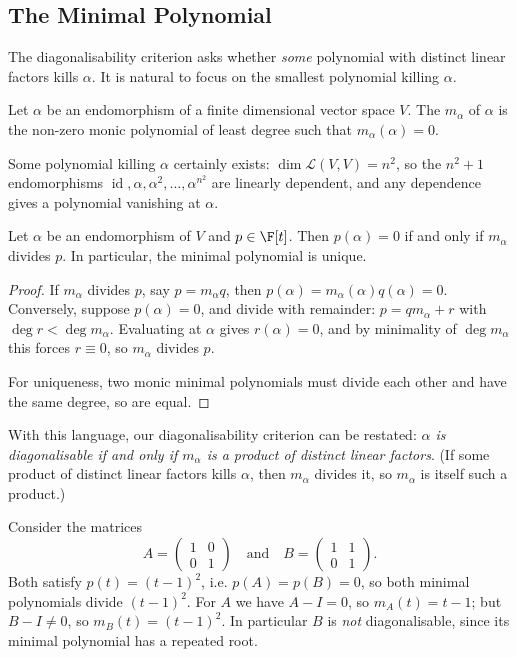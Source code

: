 \subsection{The Minimal Polynomial}

The diagonalisability criterion asks whether \emph{some} polynomial with distinct linear factors kills $\alpha$. It is natural to focus on the smallest polynomial killing $\alpha$.

\begin{definition}
    Let $\alpha$ be an endomorphism of a finite dimensional vector space $V$. The  $m_\alpha$ of $\alpha$ is the non-zero monic polynomial of least degree such that $m_\alpha(\alpha) = 0$.
\end{definition}

Some polynomial killing $\alpha$ certainly exists: $\dim \mathcal{L}(V, V) = n^2$, so the $n^2 + 1$ endomorphisms $\operatorname{id}, \alpha, \alpha^2, \dots, \alpha^{n^2}$ are linearly dependent, and any dependence gives a polynomial vanishing at $\alpha$.

\begin{lemma}
    Let $\alpha$ be an endomorphism of $V$ and $p \in \F[t]$. Then $p(\alpha) = 0$ if and only if $m_\alpha$ divides $p$. In particular, the minimal polynomial is unique.
\end{lemma}
\begin{proof}
    If $m_\alpha$ divides $p$, say $p = m_\alpha q$, then $p(\alpha) = m_\alpha(\alpha)q(\alpha) = 0$. Conversely, suppose $p(\alpha) = 0$, and divide with remainder: $p = q m_\alpha + r$ with $\deg r < \deg m_\alpha$. Evaluating at $\alpha$ gives $r(\alpha) = 0$, and by minimality of $\deg m_\alpha$ this forces $r \equiv 0$, so $m_\alpha$ divides $p$.

    For uniqueness, two monic minimal polynomials must divide each other and have the same degree, so are equal.
\end{proof}

With this language, our diagonalisability criterion can be restated: \emph{$\alpha$ is diagonalisable if and only if $m_\alpha$ is a product of distinct linear factors}. (If some product of distinct linear factors kills $\alpha$, then $m_\alpha$ divides it, so $m_\alpha$ is itself such a product.)

\begin{example}
    Consider the matrices
    $$
    A = \begin{pmatrix} 1 & 0 \\ 0 & 1\end{pmatrix} \quad \text{and} \quad B = \begin{pmatrix} 1 & 1 \\ 0 & 1\end{pmatrix}.
    $$
    Both satisfy $p(t) = (t - 1)^2$, i.e. $p(A) = p(B) = 0$, so both minimal polynomials divide $(t-1)^2$. For $A$ we have $A - I = 0$, so $m_A(t) = t - 1$; but $B - I \neq 0$, so $m_B(t) = (t - 1)^2$. In particular $B$ is \emph{not} diagonalisable, since its minimal polynomial has a repeated root.
\end{example}

